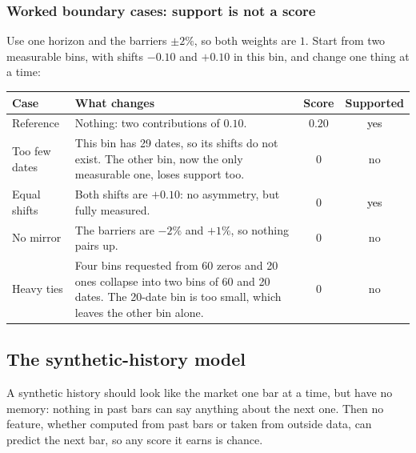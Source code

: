 \documentclass[11pt]{article}
\newcommand{\heatcell}[3][black]{\cellcolor{#2}\textcolor{#1}{#3}}
\renewcommand{\arraystretch}{1.15}
\newcommand{\topic}[1]{\Needspace{6\baselineskip}\subsubsection*{#1}}
\begin{document}
\topic{Worked boundary cases: support is not a score}

Use one horizon and the barriers $\pm2\%$, so both weights are $1$. Start
from two measurable bins, with shifts $-0.10$ and $+0.10$ in this bin, and
change one thing at a time:
\begin{center}
\renewcommand{\arraystretch}{1.35}
\begin{tabularx}{\linewidth}{@{}l >{\raggedright\arraybackslash}X c c@{}}
\toprule
\rowcolor{ConceptPaper}
\textbf{Case} & \textbf{What changes} & \textbf{Score} & \textbf{Supported} \\
\midrule
Reference & Nothing: two contributions of $0.10$. & $0.20$ & \heatcell{ConceptPaper}{yes} \\
Too few dates & This bin has 29 dates, so its shifts do not exist. The other
  bin, now the only measurable one, loses support too. & $0$ & no \\
Equal shifts & Both shifts are $+0.10$: no asymmetry, but fully measured. & $0$ & \heatcell{ConceptPaper}{yes} \\
No mirror & The barriers are $-2\%$ and $+1\%$, so nothing pairs up. & $0$ & no \\
Heavy ties & Four bins requested from 60 zeros and 20 ones collapse into
  two bins of 60 and 20 dates. The 20-date bin is too small, which
  leaves the other bin alone. & $0$ & no \\
\bottomrule
\end{tabularx}
\end{center}

\subsection{The synthetic-history model}\label{sec:null}

A synthetic history should look like the market one bar at a time, but have
no memory: nothing in past bars can say anything about the next one. Then
no feature, whether computed from past bars or taken from outside data, can
predict the next bar, so any score it
earns is chance.
\end{document}
